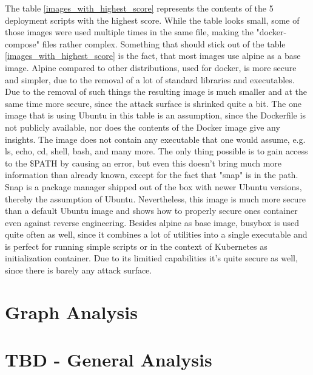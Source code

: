 The table \ref{images_with_highest_score} represents the contents of the 5 deployment scripts with the highest score. While the table looks small, some of those images were used multiple times in the same file, making the "docker-compose" files rather complex.
Something that should stick out of the table \ref{images_with_highest_score} is the fact, that most images use alpine as a base image. Alpine compared to other distributions, used for docker, is more secure and simpler, due to the removal of a lot of standard libraries and executables. Due to the removal of such things the resulting image is much smaller and at the same time more secure, since the attack surface is shrinked quite a bit.
The one image that is using Ubuntu in this table is an assumption, since the Dockerfile is not publicly available, nor does the contents of the Docker image give any insights. The image does not contain any executable that one would assume, e.g. ls, echo, cd, shell, bash, and many more. The only thing possible is to gain access to the \$PATH by causing an error, but even this doesn't bring much more information than already known, except for the fact that "snap" is in the path. Snap is a package manager shipped out of the box with newer Ubuntu versions, thereby the assumption of Ubuntu. Nevertheless, this image is much more secure than a default Ubuntu image and shows how to properly secure ones container even against reverse engineering.
Besides alpine as base image, busybox is used quite often as well, since it combines a lot of utilities into a single executable and is perfect for running simple scripts or in the context of Kubernetes as initialization container. Due to its limitied capabilities it's quite secure as well, since there is barely any attack surface.



\section{Graph Analysis}
\section{TBD - General Analysis}